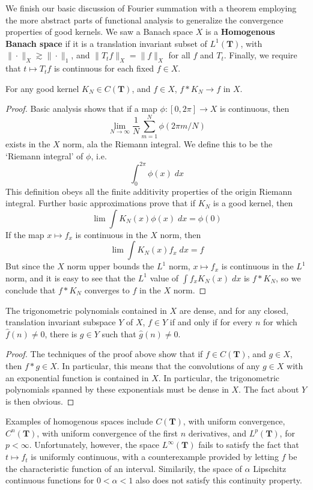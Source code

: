 We finish our basic discussion of Fourier summation with a theorem employing the more abstract parts of functional analysis to generalize the convergence properties of good kernels. We saw a Banach space $X$ is a {\bf Homogenous Banach space} if it is a translation invariant subset of $L^1(\mathbf{T})$, with $\| \cdot \|_X \gtrsim \| \cdot \|_1$, and $\| T_t f \|_X = \| f \|_X$ for all $f$ and $T_t$. Finally, we require that $t \mapsto T_t f$ is continuous for each fixed $f \in X$.

\begin{theorem}
	For any good kernel $K_N \in C(\mathbf{T})$, and $f \in X$, $f * K_N \to f$ in $X$.
\end{theorem}
\begin{proof}
	Basic analysis shows that if a map $\phi: [0,2\pi] \to X$ is continuous, then
%
\[ \lim_{N \to \infty} \frac{1}{N} \sum_{m = 1}^N \phi(2\pi m/N) \]
%
exists in the $X$ norm, ala the Riemann integral. We define this to be the `Riemann integral' of $\phi$, i.e.
%
\[ \int_0^{2\pi} \phi(x)\; dx \]
%
This definition obeys all the finite additivity properties of the origin Riemann integral. Further basic approximations prove that if $K_N$ is a good kernel, then
%
\[ \lim \int K_N(x) \phi(x)\; dx = \phi(0) \]
%
If the map $x \mapsto f_x$ is continuous in the $X$ norm, then
%
\[ \lim \int K_N(x) f_x\; dx = f \]
%
But since the $X$ norm upper bounds the $L^1$ norm, $x \mapsto f_x$ is continuous in the $L^1$ norm, and it is easy to see that the $L^1$ value of $\int f_x K_N(x)\; dx$ is $f * K_N$, so we conclude that $f * K_N$ converges to $f$ in the $X$ norm.
\end{proof}

\begin{corollary}
	The trigonometric polynomials contained in $X$ are dense, and for any closed, translation invariant subspace $Y$ of $X$, $f \in Y$ if and only if for every $n$ for which $\widehat{f}(n) \neq 0$, there is $g \in Y$ such that $\widehat{g}(n) \neq 0$.
\end{corollary}
\begin{proof}
	The techniques of the proof above show that if $f \in C(\mathbf{T})$, and $g \in X$, then $f * g \in X$. In particular, this means that the convolutions of any $g \in X$ with an exponential function is contained in $X$. In particular, the trigonometric polynomials spanned by these exponentials must be dense in $X$. The fact about $Y$ is then obvious.
\end{proof}

Examples of homogenous spaces include $C(\mathbf{T})$, with uniform convergence, $C^n(\mathbf{T})$, with uniform convergence of the first $n$ derivatives, and $L^p(\mathbf{T})$, for $p < \infty$. Unfortunately, however, the space $L^\infty(\mathbf{T})$ fails to satisfy the fact that $t \mapsto f_t$ is uniformly continuous, with a counterexample provided by letting $f$ be the characteristic function of an interval. Similarily, the space of $\alpha$ Lipschitz continuous functions for $0 < \alpha < 1$ also does not satisfy this continuity property.

